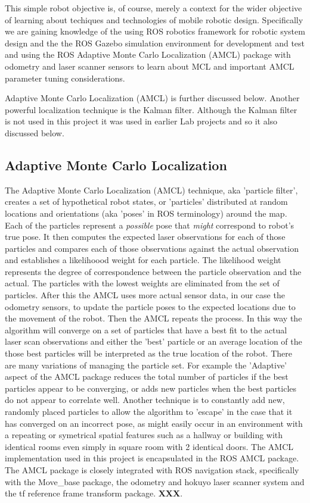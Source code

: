 \documentclass[10pt,journal,compsoc]{IEEEtran}
\begin{document}
This simple robot objective is, of course, merely a context for the wider objective of learning about techiques and technologies of mobile robotic design. Specifically we are gaining knowledge of the using ROS robotics framework for robotic system design and the the ROS Gazebo simulation environment for development and test and using the ROS Adaptive Monte Carlo Localization (AMCL) package with odometry and laser scanner sensors to learn about MCL and important AMCL parameter tuning considerations. 

Adaptive Monte Carlo Localization (AMCL) is further discussed below. 
Another powerful localization technique is the Kalman filter. Although the Kalman filter is not used in this project it was used in earlier Lab projects and so it also discussed below.

\subsection{Adaptive Monte Carlo Localization}
The Adaptive Monte Carlo Localization (AMCL) technique, aka 'particle filter', creates a set of hypothetical robot states, or 'particles' distributed at random locations and orientations (aka 'poses' in ROS terminology) around the map. Each of the particles represent a \textit{possible} pose that \textit{ might} correspond to robot's true pose. It then computes the expected laser observations for each of those particles and compares each of those observations against the actual observation and establishes a likelihoood weight for each particle. The likelihood weight represents the degree of correspondence between the particle observation and the actual. The particles with the lowest weights are eliminated from the set of particles. After this the AMCL uses more actual sensor data, in our case the odometry sensors, to update the particle poses to the expected locations due to the movement of the robot. Then the AMCL repeats the process. In this way the algorithm will converge on a set of particles that have a best fit to the actual laser scan observations and either the 'best' particle or an average location of the those best particles will be interpreted as the true location of the robot.
There are many variations of managing the particle set. For example the 'Adaptive' aspect of the AMCL package reduces the total number of particles if the best particles appear to be converging, or adds new particles when the best particles do not appear to correlate well. Another technique is to constantly add new, randomly placed particles to allow the algorithm to 'escape' in the case that it has converged on an incorrect pose, as might easily occur in an environment with a repeating or symetrical spatial features such as a hallway or building with identical rooms even simply in square room with 2 identical doors.
\hfill \vspace{\baselineskip}
The AMCL implementation used in this project is encapsulated in the ROS AMCL package. The AMCL package is closely integrated with ROS navigation stack, specifically with the Move\_base package, the odometry and hokuyo laser scanner system and the tf reference frame transform package. \textbf{ XXX}.
\end{document}
